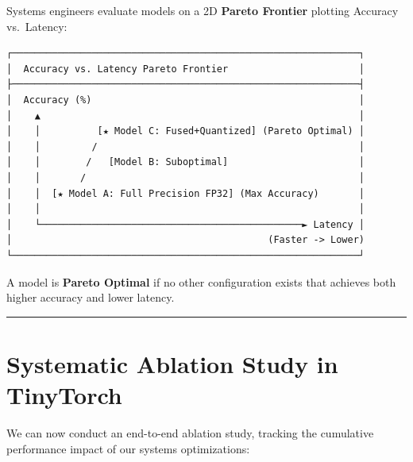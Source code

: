 \documentclass[
  letterpaper,
]{scrbook}
\begin{document}
Systems engineers evaluate models on a 2D \textbf{Pareto Frontier}
plotting Accuracy vs.~Latency:

\begin{verbatim}
┌─────────────────────────────────────────────────────────────┐
│  Accuracy vs. Latency Pareto Frontier                       │
├─────────────────────────────────────────────────────────────┤
│  Accuracy (%)                                               │
│    ▲                                                        │
│    │          [★ Model C: Fused+Quantized] (Pareto Optimal) │
│    │         /                                              │
│    │        /   [Model B: Suboptimal]                       │
│    │       /                                                │
│    │  [★ Model A: Full Precision FP32] (Max Accuracy)       │
│    │                                                        │
│    └──────────────────────────────────────────────► Latency │
│                                             (Faster -> Lower)
└─────────────────────────────────────────────────────────────┘
\end{verbatim}

A model is \textbf{Pareto Optimal} if no other configuration exists that
achieves both higher accuracy and lower latency.

\begin{center}\rule{0.5\linewidth}{0.5pt}\end{center}

\section{Systematic Ablation Study in
TinyTorch}\label{systematic-ablation-study-in-tinytorch}

We can now conduct an end-to-end ablation study, tracking the cumulative
performance impact of our systems optimizations:
\end{document}
